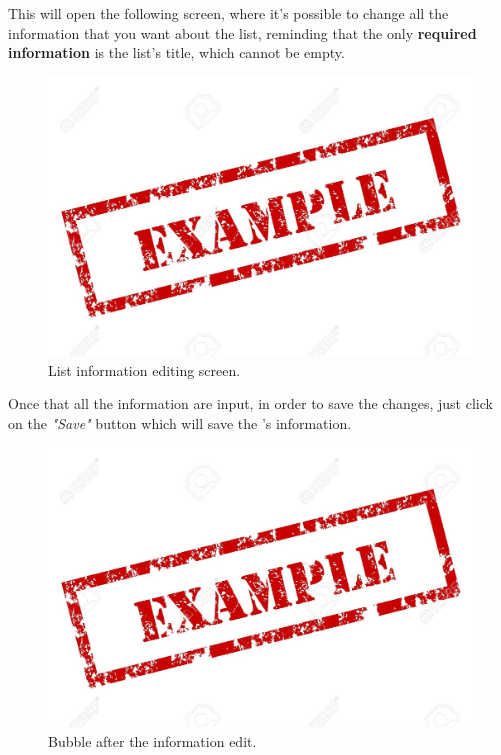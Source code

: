This will open the following screen, where it's possible to change all the information that you want about the list, reminding that the only \textbf{required information} is the list's title, which cannot be empty.

\begin{figure}[H]
  \centering 
  \includegraphics[width=\textwidth]{Sections/3-HowToUse/Images/example.jpeg}
  \caption{List information editing screen.}
\end{figure}

Once that all the information are input, in order to save the changes, just click on the \textit{"Save"} button which will save the 's information.

\begin{figure}[H]
  \centering 
  \includegraphics[width=\textwidth]{Sections/3-HowToUse/Images/example.jpeg}
  \caption{Bubble after the information edit.}
\end{figure}